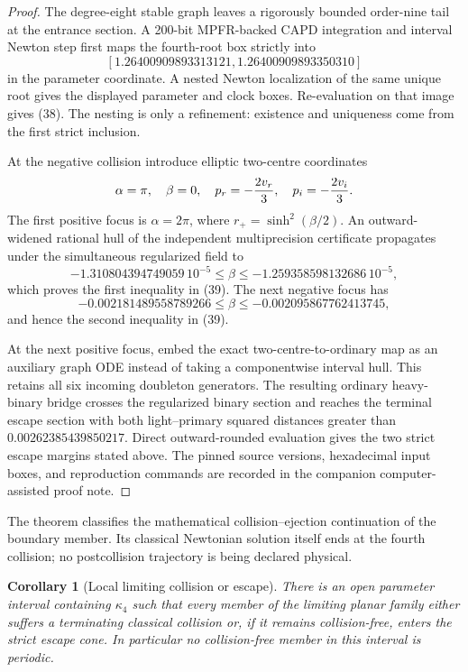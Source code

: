 \documentclass[11pt]{article}
\newtheorem{corollary}[theorem]{Corollary}
\begin{document}
\begin{proof}
The degree-eight stable graph leaves a rigorously bounded order-nine tail at
the entrance section.  A 200-bit MPFR-backed CAPD integration and interval
Newton step first maps the fourth-root box strictly into
\[
 [1.26400909893313121,1.26400909893350310]
\]
in the parameter coordinate.  A nested Newton localization of the same
unique root gives the displayed parameter and clock boxes.  Re-evaluation on
that image gives (38).  The nesting is only a refinement: existence and
uniqueness come from the first strict inclusion.

At the negative collision introduce elliptic two-centre coordinates
\[
 \alpha=\pi,\quad\beta=0,
 \quad p_r=-{2v_r\over3},\quad p_i=-{2v_i\over3}.
\]
The first positive focus is $\alpha=2\pi$, where
$r_+=\sinh^2(\beta/2)$.  An outward-widened rational hull of the independent
multiprecision certificate propagates under the simultaneous regularized
field to
\[
 -1.310804394749059\,10^{-5}
 \leq\beta\leq-1.259358598132686\,10^{-5},
\]
which proves the first inequality in (39).  The next negative focus has
\[
 -0.002181489558789266
 \leq\beta\leq-0.002095867762413745,
\]
and hence the second inequality in (39).

At the next positive focus, embed the exact two-centre-to-ordinary map as an
auxiliary graph ODE instead of taking a componentwise interval hull.  This
retains all six incoming doubleton generators.  The resulting ordinary
heavy-binary bridge crosses the regularized binary section and reaches the
terminal escape section with both light--primary squared distances greater
than $0.00262385439850217$.  Direct outward-rounded evaluation gives the two
strict escape margins stated above.  The pinned source versions, hexadecimal
input boxes, and reproduction commands are recorded in the companion
computer-assisted proof note.
\end{proof}

The theorem classifies the mathematical collision--ejection continuation of
the boundary member.  Its classical Newtonian solution itself ends at the
fourth collision; no postcollision trajectory is being declared physical.

\begin{corollary}[Local limiting collision or escape]
There is an open parameter interval containing $\kappa_4$ such that every
member of the limiting planar family either suffers a terminating classical
collision or, if it remains collision-free, enters the strict escape cone.
In particular no collision-free member in this interval is periodic.
\end{corollary}
\end{document}
